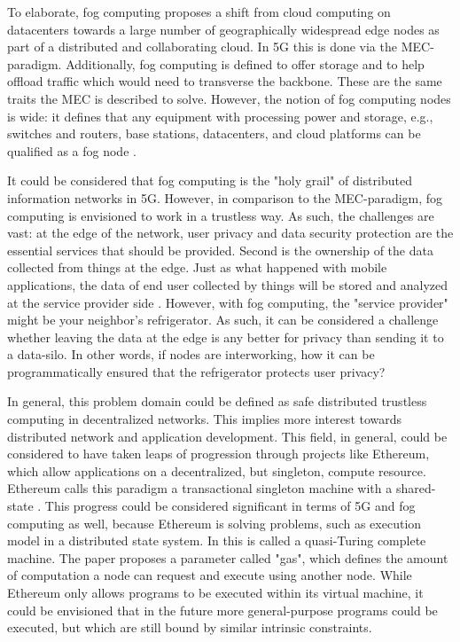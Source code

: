 \documentclass[12pt]{article}
\begin{document}
To elaborate, fog computing proposes a shift from cloud computing on datacenters towards a large number of geographically widespread edge nodes as part of a distributed and collaborating cloud. In \gls{5G} this is done via the \gls{MEC}-paradigm. Additionally, fog computing is defined to offer storage and to help offload traffic which would need to transverse the backbone. These are the same traits the \gls{MEC} is described to solve. However, the notion of fog computing nodes is wide: it defines that any equipment with processing power and storage, e.g., switches and routers, base stations, datacenters, and cloud platforms can be qualified as a fog node \cite{taleb2017multi}.

It could be considered that fog computing is the "holy grail" of distributed information networks in \gls{5G}. However, in comparison to the \gls{MEC}-paradigm, fog computing is envisioned to work in a trustless way. As such, the challenges are vast: at the edge of the network, user privacy and data security protection are the essential services that should be provided. Second is the ownership of the data collected from things at the edge. Just as what happened with mobile applications, the data of end user collected by things will be stored and analyzed at the service provider side \cite{shi2016edge}. However, with fog computing, the "service provider" might be your neighbor's refrigerator. As such, it can be considered a challenge whether leaving the data at the edge is any better for privacy than sending it to a data-silo. In other words, if nodes are interworking, how it can be programmatically ensured that the refrigerator protects user privacy?

In general, this problem domain could be defined as safe distributed trustless computing in decentralized networks. This implies more interest towards distributed network and application development. This field, in general, could be considered to have taken leaps of progression through projects like Ethereum, which allow applications on a decentralized, but singleton, compute resource. Ethereum calls this paradigm a transactional singleton machine with a shared-state \cite{wood2014ethereum}. This progress could be considered significant in terms of \gls{5G} and fog computing as well, because Ethereum is solving problems, such as execution model in a distributed state system. In \cite{wood2014ethereum} this is called a quasi-Turing complete machine. The paper proposes a parameter called "gas", which defines the amount of computation a node can request and execute using another node. While Ethereum only allows programs to be executed within its virtual machine, it could be envisioned that in the future more general-purpose programs could be executed, but which are still bound by similar intrinsic constraints.
\end{document}
